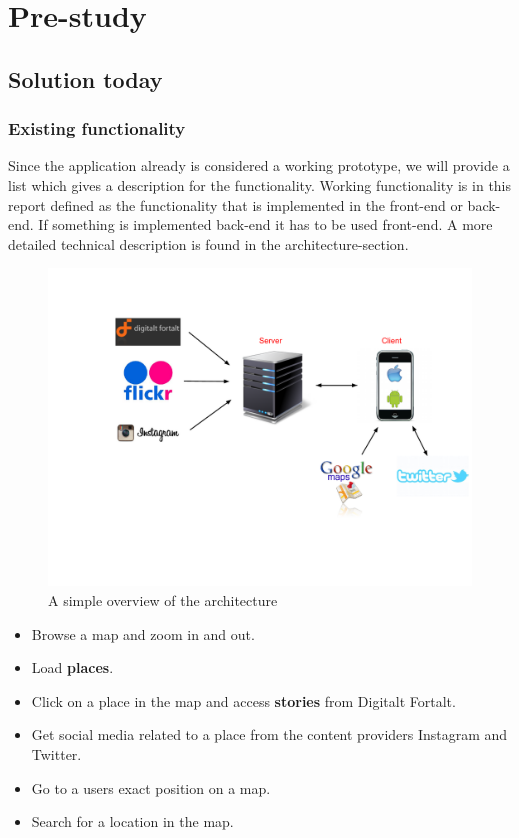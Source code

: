 \section{Pre-study}
\thispagestyle{plain}
	\subsection{Solution today}
		\subsubsection{Existing functionality}
Since the application already is considered a working prototype, we will provide a list which gives a description for the functionality. Working functionality is in this report defined as the functionality that is implemented in the front-end or back-end. If something is implemented back-end it has to be used front-end. A more detailed technical description is found in the architecture-section.

\begin{figure}[h!]
\begin{center}
\includegraphics[scale=0.45]{ntoverview-architecture}
\caption{A simple overview of the architecture}
\end{center}
\end{figure}

\begin{itemize}
\item Browse a map and zoom in and out.
\item Load \textbf{places}.
\item Click on a place in the map and access \textbf{stories} from Digitalt Fortalt.
\item Get social media related to a place from the content providers Instagram and Twitter.
\item Go to a users exact position on a map.
\item Search for a location in the map.
\end{itemize}
	
